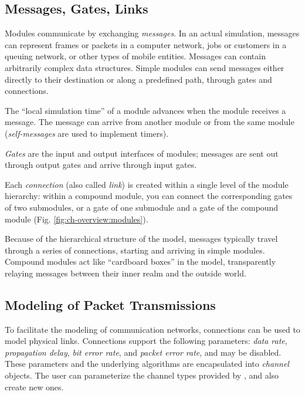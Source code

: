 \subsection{Messages, Gates, Links}
\label{sec:overview:messages-gates-links}

Modules communicate by exchanging
\textit{messages}. In an actual simulation,
messages can represent frames or packets in a computer network, jobs
or customers in a queuing network, or other types of mobile entities.
Messages can contain arbitrarily complex data structures. Simple
modules can send messages either directly to their destination or
along a predefined path, through gates and connections.


The ``local simulation time'' of a module advances when the module
receives a message. The message can arrive from another module
or from the same module (\textit{self-messages} are used to implement
timers).


\textit{Gates} are the input and output interfaces of
modules; messages are sent out through output gates and arrive through
input gates.

Each \textit{connection} (also called
\textit{link}) is created within a single level of the
module hierarchy: within a compound module, you can connect the
corresponding gates of two submodules, or a gate of one submodule and
a gate of the compound module (Fig.
\ref{fig:ch-overview:modules}).

Because of the hierarchical structure of the model, messages typically
travel through a series of connections, starting and arriving in simple
modules. Compound modules act like ``cardboard boxes'' in the model,
transparently relaying messages between their inner realm and the
outside world.


\subsection{Modeling of Packet Transmissions}
\label{sec:overview:modeling-of-packet-transmissions}

To facilitate the modeling of communication networks, connections
can be used to model physical links. Connections support
the following parameters: \textit{data rate}, \textit{propagation delay},
\textit{bit error rate}, and \textit{packet error rate}, and may be
disabled. These parameters and the underlying algorithms are encapsulated
into \textit{channel} objects. The user can parameterize the channel
types provided by {\opp}, and also create new ones.


